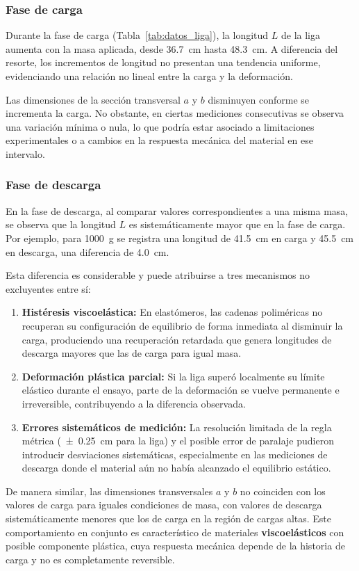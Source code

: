 \subsubsection{Fase de carga}

Durante la fase de carga (Tabla~\ref{tab:datos_liga}), la longitud $L$
de la liga aumenta con la masa aplicada, desde \qty{36,7}{cm} hasta
\qty{48,3}{cm}. A diferencia del resorte, los incrementos de longitud
no presentan una tendencia uniforme, evidenciando una relación no lineal
entre la carga y la deformación.

Las dimensiones de la sección transversal $a$ y $b$ disminuyen conforme
se incrementa la carga. No obstante, en ciertas mediciones consecutivas
se observa una variación mínima o nula, lo que podría estar asociado a
limitaciones experimentales o a cambios en la respuesta mecánica del
material en ese intervalo.

\subsubsection{Fase de descarga}

En la fase de descarga, al comparar valores correspondientes a una misma
masa, se observa que la longitud $L$ es sistemáticamente mayor que en la
fase de carga. Por ejemplo, para \qty{1000}{g} se registra una longitud
de \qty{41,5}{cm} en carga y \qty{45,5}{cm} en descarga, una diferencia
de \qty{4,0}{cm}.

Esta diferencia es considerable y puede atribuirse a tres mecanismos no
excluyentes entre sí:

\begin{enumerate}
    \item \textbf{Histéresis viscoelástica:} En elastómeros, las cadenas
    poliméricas no recuperan su configuración de equilibrio de forma
    inmediata al disminuir la carga, produciendo una recuperación retardada
    que genera longitudes de descarga mayores que las de carga para igual
    masa.

    \item \textbf{Deformación plástica parcial:} Si la liga superó
    localmente su límite elástico durante el ensayo, parte de la deformación
    se vuelve permanente e irreversible, contribuyendo a la diferencia
    observada.

    \item \textbf{Errores sistemáticos de medición:} La resolución limitada
    de la regla métrica (\qty{\pm 0,25}{cm} para la liga) y el posible
    error de paralaje pudieron introducir desviaciones sistemáticas,
    especialmente en las mediciones de descarga donde el material aún no
    había alcanzado el equilibrio estático.
\end{enumerate}

De manera similar, las dimensiones transversales $a$ y $b$ no coinciden
con los valores de carga para iguales condiciones de masa, con valores
de descarga sistemáticamente menores que los de carga en la región de
cargas altas. Este comportamiento en conjunto es característico de
materiales \textbf{viscoelásticos} con posible componente plástica,
cuya respuesta mecánica depende de la historia de carga y no es
completamente reversible.